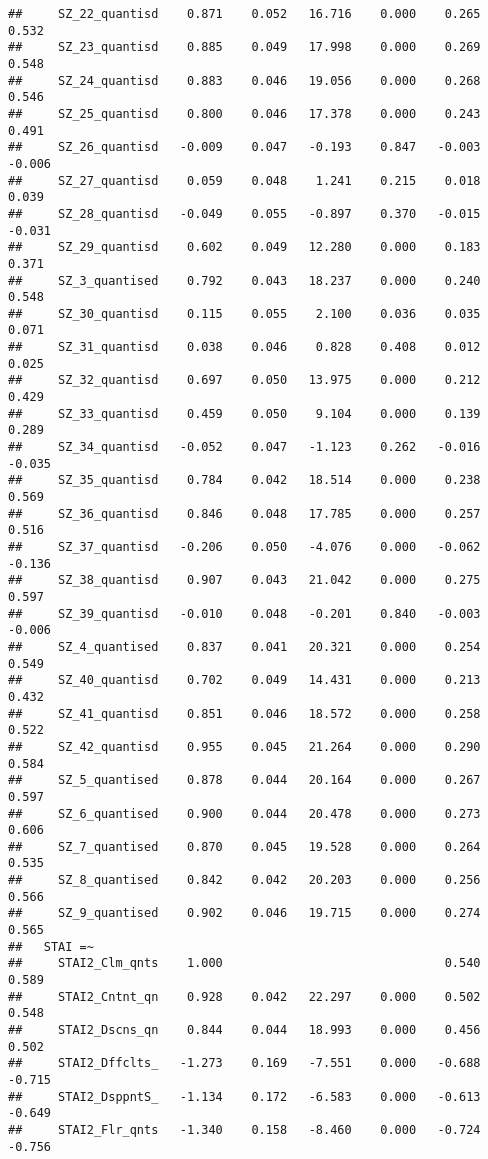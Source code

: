 \documentclass[]{article}
\begin{document}
\begin{verbatim}
##     SZ_22_quantisd    0.871    0.052   16.716    0.000    0.265    0.532
##     SZ_23_quantisd    0.885    0.049   17.998    0.000    0.269    0.548
##     SZ_24_quantisd    0.883    0.046   19.056    0.000    0.268    0.546
##     SZ_25_quantisd    0.800    0.046   17.378    0.000    0.243    0.491
##     SZ_26_quantisd   -0.009    0.047   -0.193    0.847   -0.003   -0.006
##     SZ_27_quantisd    0.059    0.048    1.241    0.215    0.018    0.039
##     SZ_28_quantisd   -0.049    0.055   -0.897    0.370   -0.015   -0.031
##     SZ_29_quantisd    0.602    0.049   12.280    0.000    0.183    0.371
##     SZ_3_quantised    0.792    0.043   18.237    0.000    0.240    0.548
##     SZ_30_quantisd    0.115    0.055    2.100    0.036    0.035    0.071
##     SZ_31_quantisd    0.038    0.046    0.828    0.408    0.012    0.025
##     SZ_32_quantisd    0.697    0.050   13.975    0.000    0.212    0.429
##     SZ_33_quantisd    0.459    0.050    9.104    0.000    0.139    0.289
##     SZ_34_quantisd   -0.052    0.047   -1.123    0.262   -0.016   -0.035
##     SZ_35_quantisd    0.784    0.042   18.514    0.000    0.238    0.569
##     SZ_36_quantisd    0.846    0.048   17.785    0.000    0.257    0.516
##     SZ_37_quantisd   -0.206    0.050   -4.076    0.000   -0.062   -0.136
##     SZ_38_quantisd    0.907    0.043   21.042    0.000    0.275    0.597
##     SZ_39_quantisd   -0.010    0.048   -0.201    0.840   -0.003   -0.006
##     SZ_4_quantised    0.837    0.041   20.321    0.000    0.254    0.549
##     SZ_40_quantisd    0.702    0.049   14.431    0.000    0.213    0.432
##     SZ_41_quantisd    0.851    0.046   18.572    0.000    0.258    0.522
##     SZ_42_quantisd    0.955    0.045   21.264    0.000    0.290    0.584
##     SZ_5_quantised    0.878    0.044   20.164    0.000    0.267    0.597
##     SZ_6_quantised    0.900    0.044   20.478    0.000    0.273    0.606
##     SZ_7_quantised    0.870    0.045   19.528    0.000    0.264    0.535
##     SZ_8_quantised    0.842    0.042   20.203    0.000    0.256    0.566
##     SZ_9_quantised    0.902    0.046   19.715    0.000    0.274    0.565
##   STAI =~                                                               
##     STAI2_Clm_qnts    1.000                               0.540    0.589
##     STAI2_Cntnt_qn    0.928    0.042   22.297    0.000    0.502    0.548
##     STAI2_Dscns_qn    0.844    0.044   18.993    0.000    0.456    0.502
##     STAI2_Dffclts_   -1.273    0.169   -7.551    0.000   -0.688   -0.715
##     STAI2_DsppntS_   -1.134    0.172   -6.583    0.000   -0.613   -0.649
##     STAI2_Flr_qnts   -1.340    0.158   -8.460    0.000   -0.724   -0.756

\end{verbatim}
\end{document}
